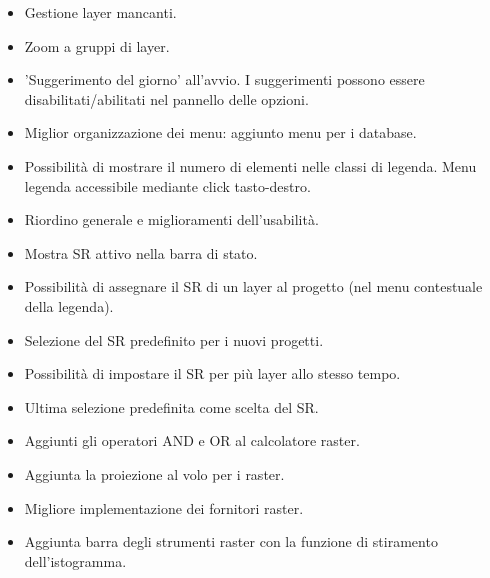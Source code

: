 
\begin{itemize}[label=--]
\item Gestione layer mancanti.
\item Zoom a gruppi di layer.
\item 'Suggerimento del giorno' all'avvio. I suggerimenti possono essere 
disabilitati/abilitati nel pannello delle opzioni.
\item Miglior organizzazione dei menu: aggiunto menu per i database.
\item Possibilità di mostrare il numero di elementi nelle classi di legenda.
Menu legenda accessibile mediante click tasto-destro.
\item Riordino generale e miglioramenti dell'usabilità.
\end{itemize}


\begin{itemize}[label=--]
\item Mostra SR attivo nella barra di stato.
\item Possibilità di assegnare il SR di un layer al progetto (nel menu contestuale della legenda).
\item Selezione del SR predefinito per i nuovi progetti.
\item Possibilità di impostare il SR per più layer allo stesso tempo.
\item Ultima selezione predefinita come scelta del SR.
\end{itemize}


\begin{itemize}[label=--]
\item Aggiunti gli operatori AND e OR al calcolatore raster.
\item Aggiunta la proiezione al volo per i raster.

\item Migliore implementazione dei fornitori raster.
\item Aggiunta barra degli strumenti raster con la funzione di stiramento dell'istogramma.
\end{itemize}



